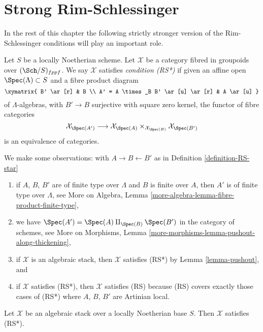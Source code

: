 \section{Strong Rim-Schlessinger}
\label{section-RS-star}

\noindent
In the rest of this chapter the following strictly stronger version
of the Rim-Schlessinger conditions will play an important role.

\begin{definition}
\label{definition-RS-star}
Let $S$ be a locally Noetherian scheme. Let $\mathcal{X}$ be a category
fibred in groupoids over $(\Sch/S)_{fppf}$. We say $\mathcal{X}$
satisfies {\it condition (RS*)} if given an affine open
$\Spec(\Lambda) \subset S$ and a fibre product diagram
$$
\xymatrix{
B' \ar[r] & B \\
A' = A \times_B B' \ar[u] \ar[r] & A \ar[u]
}
$$
of $\Lambda$-algebras, with $B' \to B$ surjective with square zero kernel,
the functor of fibre categories
$$
\mathcal{X}_{\Spec(A')}
\longrightarrow
\mathcal{X}_{\Spec(A)} \times_{\mathcal{X}_{\Spec(B)}} \mathcal{X}_{\Spec(B')}
$$
is an equivalence of categories.
\end{definition}

\noindent
We make some observations:
with $A \to B \leftarrow B'$ as in Definition \ref{definition-RS-star}
\begin{enumerate}
\item if $A$, $B$, $B'$ are of finite type over $\Lambda$ and
$B$ is finite over $A$, then $A'$ is of finite type over $\Lambda$, see
More on Algebra, Lemma \ref{more-algebra-lemma-fibre-product-finite-type},
\item we have $\Spec(A') = \Spec(A) \amalg_{\Spec(B)} \Spec(B')$
in the category of schemes, see
More on Morphisms, Lemma \ref{more-morphisms-lemma-pushout-along-thickening},
\item if $\mathcal{X}$ is an algebraic stack, then $\mathcal{X}$ satisfies
(RS*) by Lemma \ref{lemma-pushout}, and
\item if $\mathcal{X}$ satisfies
(RS*), then $\mathcal{X}$ satisfies (RS) because (RS) covers exactly those
cases of (RS*) where $A$, $B$, $B'$ are Artinian local.
\end{enumerate}

\begin{lemma}
\label{lemma-algebraic-stack-RS-star}
Let $\mathcal{X}$ be an algebraic stack over a locally Noetherian base
$S$. Then $\mathcal{X}$ satisfies (RS*).
\end{lemma}

